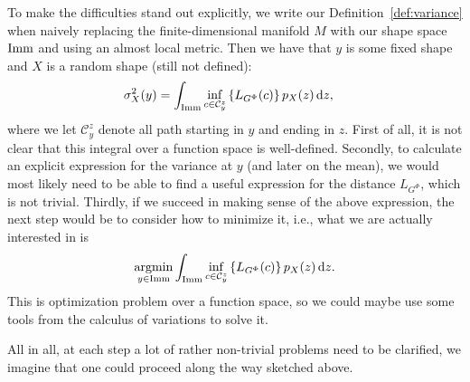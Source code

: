 To make the difficulties stand out explicitly, we write our Definition~\ref{def:variance} when naively replacing the finite-dimensional manifold $M$ with our shape space $\mathop{}\!\mathrm{Imm}$ and using an almost local metric. Then we have that $y$ is some fixed shape and $X$ is a random shape (still not defined):
\begin{align*}
  \sigma^2_X(y) &  = \int_{\mathop{}\!\mathrm{Imm}}
                  \inf_{c \in \mathcal{C}_{y}^z}
                  \left\{
                  L_{G^\Phi}(c)
                  \right\}
                  p_X(z)
                  \mathop{}\!\mathrm{d} z
  ,
\end{align*}
where we let $\mathcal{C}_y^z$ denote all path starting in $y$ and ending in $z$.
First of all, it is not clear that this integral over a function space is well-defined.
Secondly, to calculate an explicit expression for the variance at $y$ (and later on the mean), we would most likely need to be able to find a useful expression for the distance $L_{G^{\Phi}}$, which is not trivial.
Thirdly, if we succeed in making sense of the above expression, the next step would be to consider how to minimize it, i.e., what we are actually interested in is
\begin{equation*}
  \operatorname*{argmin}_{y \in \mathop{}\!\mathrm{Imm}}
  \int_{\mathop{}\!\mathrm{Imm}}
  \inf_{c \in \mathcal{C}_{y}^z}
  \left\{
    L_{G^\Phi}(c)
  \right\}
  p_X(z)
  \mathop{}\!\mathrm{d} z.
\end{equation*}
This is optimization problem over a function space, so we could maybe use some tools from the calculus of variations to solve it.

All in all, at each step a lot of rather non-trivial problems need to be clarified, we imagine that one could proceed along the way sketched above.


